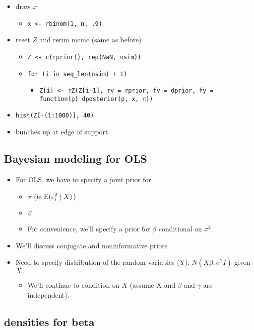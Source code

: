\begin{itemize}
\begin{itemize}
\item draw $x$
\begin{itemize}
\item \texttt{x <- rbinom(1, n, .9)}
\end{itemize}
\item reset $Z$ and rerun mcmc (same as before)
\begin{itemize}
\item \texttt{Z <- c(rprior(), rep(NaN, nsim))}
\item \texttt{for (i in seq\_len(nsim) + 1)}
\begin{itemize}
\item \texttt{Z[i] <- rZ(Z[i-1], rv = rprior, fv = dprior, fy = function(p) dposterior(p, x, n))}
\end{itemize}
\end{itemize}
\item \texttt{hist(Z[-(1:1000)], 40)}
\item bunches up at edge of support
\end{itemize}
\end{itemize}

\subsection{Bayesian modeling for OLS}

\begin{itemize}
\item For OLS, we have to specify a joint prior for
\begin{itemize}
\item $\sigma$ (ie $\operatorname{E}(\varepsilon^2_i \mid X)$)
\item $\beta$
\item For convenience, we'll specify a prior for $\beta$ conditional on $\sigma^2$.
\end{itemize}
\item We'll discuss conjugate and noninformative priors
\item Need to specify distribution of the random variables (Y): $N(X\beta,
  \sigma^2 I)$ given $X$
\begin{itemize}
\item We'll continue to condition on $X$ (assume X and $\beta$ and $\gamma$ are
  independent).
\end{itemize}
\end{itemize}

\subsection{densities for beta}

